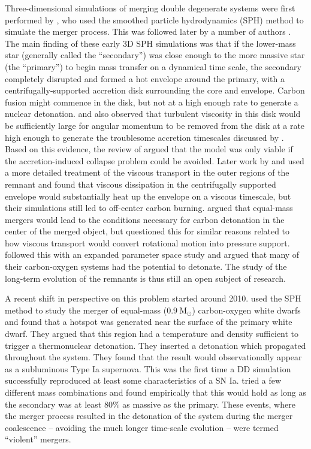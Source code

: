 \documentclass[iop]{../emulateapj}
\newcommand{\msolar}{\mathrm{M}_\odot}
\begin{document}
Three-dimensional simulations of merging double degenerate systems were 
first performed by \citet{benz:1990}, who used the smoothed particle
hydrodynamics (SPH) method to simulate the merger process. This was 
followed later by a number of authors 
\citep{rasio_shapiro:1995,segretain:1997,guerrero:2004,yoon:2007,loren-aguilar:2009,raskin:2012}.
The main finding of these early 3D SPH simulations was that if the 
lower-mass star (generally called the ``secondary'') was
close enough to the more massive star (the ``primary'') to begin mass
transfer on a dynamical time scale, the secondary completely disrupted
and formed a hot envelope around the primary, with a
centrifugally-supported accretion disk surrounding the core and
envelope. Carbon fusion might commence in the disk, but not at a 
high enough rate to generate a nuclear detonation. \cite{mochkovitch_livio:1990} 
and \cite{livio:2000}  also observed that turbulent viscosity in this disk 
would be sufficiently large for angular momentum to be removed from the 
disk at a rate high enough to generate the troublesome accretion 
timescales discussed by \cite{tutukov_yungelson:1979}. Based on this
evidence, the review of \cite{hillebrandtniemeyer2000} argued that the
model was only viable if the accretion-induced collapse problem could
be avoided. Later work by \cite{shen:2012} and \cite{schwab:2012} used
a more detailed treatment of the viscous transport in the outer
regions of the remnant and found that viscous dissipation in the centrifugally
supported envelope would substantially heat up the envelope on a  
viscous timescale, but their simulations still led to off-center carbon
burning. \cite{vankerkwijk:2010} argued that equal-mass mergers would
lead to the conditions necessary for carbon detonation in the center
of the merged object, but \cite{shen:2012} questioned this for similar
reasons related to how viscous transport would convert rotational
motion into pressure support. \cite{zhu:2013} followed this with an
expanded parameter space study and argued that many of their
carbon-oxygen systems had the potential to detonate. The study of the
long-term evolution of the remnants is thus still an open subject of
research.

A recent shift in perspective on this problem started around 2010.
\cite{pakmor:2010} used the SPH method to study the merger of 
equal-mass ($0.9\ \msolar$) carbon-oxygen white dwarfs and found 
that a hotspot was generated near the surface of the primary 
white dwarf. They argued that this region had a temperature 
and density sufficient to trigger a thermonuclear
detonation. They inserted a detonation which propagated throughout 
the system. They found that the result would observationally 
appear as a subluminous Type Ia supernova. This was the first time 
a DD simulation successfully reproduced at least some characteristics of a SN
Ia. \cite{pakmor:2011} tried a few different mass combinations and
found empirically that this would hold as long as the secondary was at
least 80\% as massive as the primary. These events, where the merger
process resulted in the detonation of the system during the merger
coalescence -- avoiding the much longer time-scale evolution -- were
termed ``violent'' mergers.
\end{document}
